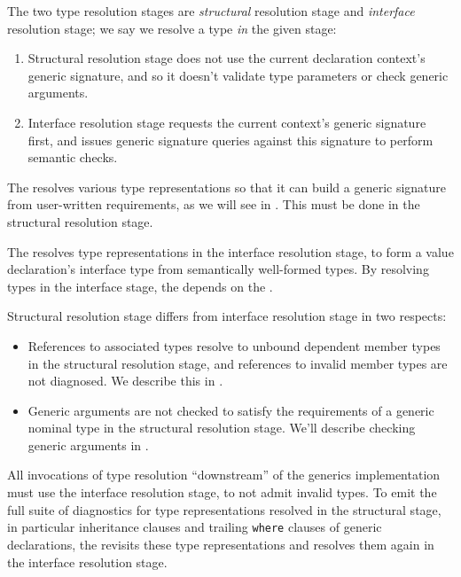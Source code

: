 \documentclass[../generics]{subfiles}
\begin{document}
The two type resolution stages are \emph{structural} resolution stage and \emph{interface} resolution stage; we say we resolve a type \emph{in} the given stage:
\begin{enumerate}
\item {}Structural resolution stage does not use the current declaration context's generic signature, and so it doesn't validate type parameters or check generic arguments.

\item {}Interface resolution stage requests the current context's generic signature first, and issues generic signature queries against this signature to perform semantic checks.
\end{enumerate}

The  resolves various type representations so that it can build a generic signature from user-written requirements, as we will see in . This must be done in the structural resolution stage.

The  resolves type representations in the interface resolution stage, to form a value declaration's interface type from semantically well-formed types. By resolving types in the interface stage, the  depends on the .

Structural resolution stage differs from interface resolution stage in two respects:
\begin{itemize}
\item References to associated types resolve to unbound dependent member types in the structural resolution stage, and references to invalid member types are not diagnosed. We describe this in .
\item Generic arguments are not checked to satisfy the requirements of a generic nominal type in the structural resolution stage. We'll describe checking generic arguments in .
\end{itemize}

All invocations of type resolution ``downstream'' of the generics implementation must use the interface resolution stage, to not admit invalid types. To emit the full suite of diagnostics for type representations resolved in the structural stage, in particular inheritance clauses and trailing \texttt{where} clauses of generic declarations, the  revisits these type representations and resolves them again in the interface resolution stage.
\end{document}

